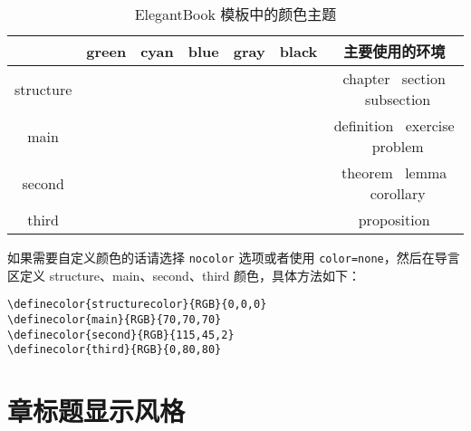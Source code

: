 \documentclass[cn,11pt,fancy]{elegantbook}
\begin{document}
\begin{table}[htbp]
\caption{ElegantBook 模板中的颜色主题\label{tab:color thm}}
\centering
\begin{tabular}{ccccccc}
\toprule
	        & \textcolor{structure1}{green} 
	        & \textcolor{structure2}{cyan} 
	        & \textcolor{structure3}{blue}
	        & \textcolor{structure4}{gray} 
	        & \textcolor{structure5}{black} 
	        & 主要使用的环境\\
\midrule
structure & \makecell{{\color{structure1}\rule{1cm}{1cm}}}
				& \makecell{{\color{structure2}\rule{1cm}{1cm}}}
				& \makecell{{\color{structure3}\rule{1cm}{1cm}}} 
				& \makecell{{\color{structure4}\rule{1cm}{1cm}}} 
				& \makecell{{\color{structure5}\rule{1cm}{1cm}}} 
				& chapter \ section \ subsection \\

main      & \makecell{{\color{main1}\rule{1cm}{1cm}}}
				& \makecell{{\color{main2}\rule{1cm}{1cm}}}
				& \makecell{{\color{main3}\rule{1cm}{1cm}}}
				& \makecell{{\color{main4}\rule{1cm}{1cm}}}
				& \makecell{{\color{main5}\rule{1cm}{1cm}}}
				& definition \ exercise \ problem \\

second    & \makecell{{\color{second1}\rule{1cm}{1cm}}}
				& \makecell{{\color{second2}\rule{1cm}{1cm}}}
				& \makecell{{\color{second3}\rule{1cm}{1cm}}}
				& \makecell{{\color{second4}\rule{1cm}{1cm}}}
				& \makecell{{\color{second5}\rule{1cm}{1cm}}}
				& theorem \ lemma \ corollary\\

third     & \makecell{{\color{third1}\rule{1cm}{1cm}}}
				& \makecell{{\color{third2}\rule{1cm}{1cm}}}
				& \makecell{{\color{third3}\rule{1cm}{1cm}}}
				& \makecell{{\color{third4}\rule{1cm}{1cm}}}
				& \makecell{{\color{third5}\rule{1cm}{1cm}}}
				& proposition\\
\bottomrule
\end{tabular}
\end{table}

如果需要自定义颜色的话请选择 \lstinline{nocolor} 选项或者使用 \lstinline{color=none}，然后在导言区定义 structure、main、second、third 颜色，具体方法如下：
\begin{lstlisting}
\definecolor{structurecolor}{RGB}{0,0,0}
\definecolor{main}{RGB}{70,70,70}    
\definecolor{second}{RGB}{115,45,2}    
\definecolor{third}{RGB}{0,80,80}   
\end{lstlisting}


\section{章标题显示风格}
\end{document}
